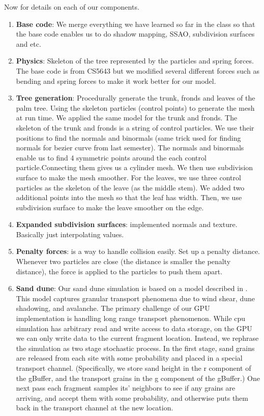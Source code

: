 \documentclass[annual]{acmsiggraph}
\begin{document}
Now for details on each of our components.
\begin{enumerate}
\item{\textbf{Base code}: We merge everything we have learned so far in the class so that the base code enables us to do shadow mapping, SSAO, subdivision surfaces and etc.}
\item{\textbf{Physics}: Skeleton of the tree represented by the particles and spring forces. The base code is from CS5643 but we modified several different forces such as bending and spring forces to make it work better for our model.}
\item{\textbf{Tree generation}: Procedurally generate the trunk, fronds and leaves of the palm tree. Using the skeleton particles (control points) to generate the mesh at run time. We applied the same model for the trunk and fronds. The skeleton of the trunk and fronds is a string of control particles. We use their positions to find the normals and binormals (same trick used for finding normals for bezier curve from last semester). The normals and binormals enable us to find 4 symmetric points around the each control particle.Connecting them gives us a cylinder mesh. We then use subdivision surface to make the mesh smoother. For the leaves, we use three control particles as the skeleton of the leave (as the middle stem). We added two additional points into the mesh so that the leaf has width. Then, we use subdivision surface to make the leave smoother on the edge.}
\item{\textbf{Expanded subdivision surfaces}: implemented normals and texture. Basically just interpolating values.}
\item{\textbf{Penalty forces}: is a way to handle collision easily. Set up a penalty distance. Whenever two particles are close (the distance is smaller the penalty distance), the force is applied to the particles to push them apart.}
\item{\textbf{Sand dune}: Our sand dune simulation is based on a model described in  \cite{momiji2002}.  This model captures granular transport phenomena due to wind shear, dune shadowing, and avalanche.  The primary challenge of our GPU implementation is handling long range transport phenomenon.  While cpu simulation has arbitrary read and write access to  data storage, on the GPU we can only write data to the current fragment location.  Instead, we rephrase the simulation as two stage stochastic process.  In the first stage, sand grains are released from each site with some probability  and placed in a special transport channel.  (Specifically, we store sand height in the r component of the gBuffer, and the transport grains in the g component of the gBuffer.)  One next pass each fragment samples its' neighbors to see if any grains are arriving, and accept them with some probability, and otherwise puts them back in the transport channel at the new location.    }

\end{enumerate}
\end{document}
